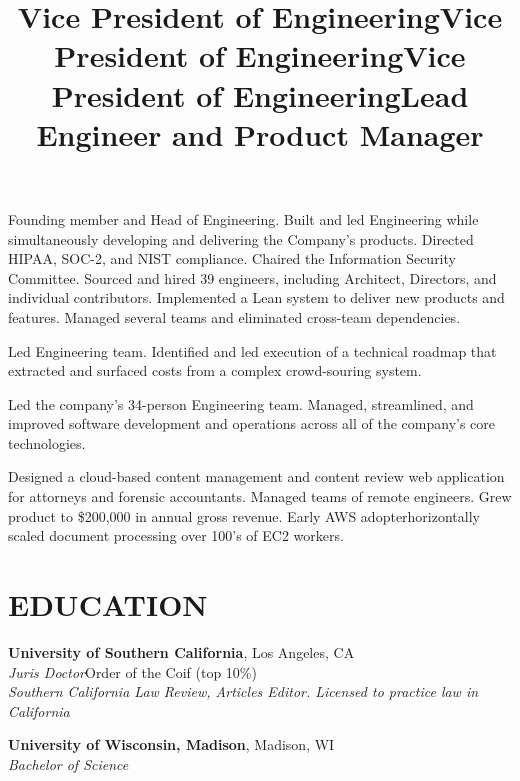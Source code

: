 \documentclass[margin]{res}
\begin{document}
\begin{resume}
\title{\textbf{Vice President of Engineering}}
\begin{position}
\hspace*{.5cm}Founding member and Head of Engineering. Built and led Engineering while simultaneously developing and delivering the Company's products. Directed HIPAA, SOC-2, and NIST compliance. Chaired the Information Security Committee. Sourced and hired 39 engineers, including Architect, Directors, and individual contributors. Implemented a Lean system to deliver new products and features. Managed several teams and eliminated cross-team dependencies.
\end{position}

\title{\textbf{Vice President of Engineering}}
\begin{position}
\hspace*{.5cm}Led Engineering team. Identified and led execution of a technical roadmap that extracted and surfaced costs from a complex crowd-souring system.
\end{position}

\title{\textbf{Vice President of Engineering}}
\begin{position}
\hspace*{.5cm}Led the company's 34-person Engineering team. Managed, streamlined, and improved software development and operations across all of the company's core technologies.
\end{position}

\title{\textbf{Lead Engineer and Product Manager}}
\begin{position}
\hspace*{.5cm}Designed a cloud-based content management and content review web application for attorneys and forensic accountants.  Managed teams of remote engineers. Grew product to \$200,000 in annual gross revenue. Early AWS adopter\textemdash horizontally scaled document processing over 100's of EC2 workers.
\end{position}


\section{EDUCATION}

\textbf{University of Southern California}, Los Angeles, CA\\
{\sl Juris Doctor}\hfill Order of the Coif
(top 10\%)
\\
{\sl Southern California Law Review, Articles Editor. Licensed to practice law in California}

\textbf{University of Wisconsin, Madison}, Madison, WI\\
{\sl Bachelor of Science}

\end{resume}
\end{document}
